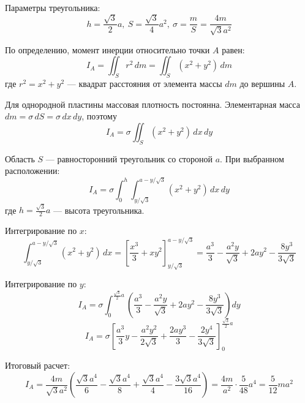 \begin{center}
\end{center}

Параметры треугольника:
\[ h = \frac{\sqrt{3}}{2}a,\ S = \frac{\sqrt{3}}{4}a^2,\ \sigma = \frac{m}{S} = \frac{4m}{\sqrt{3}a^2}\]

По определению, момент инерции относительно точки $A$ равен:
\[
I_A = \iint_S r^2 \, dm = \iint_S (x^2 + y^2) \, dm
\]
где $r^2 = x^2 + y^2$ --- квадрат расстояния от элемента массы $dm$ до вершины $A$.

Для однородной пластины массовая плотность постоянна. 
Элементарная масса $dm = \sigma \, dS = \sigma \, dx\,dy$, поэтому
\[
I_A = \sigma \iint_S (x^2 + y^2) \, dx\,dy
\]

Область $S$ --- равносторонний треугольник со стороной $a$. При выбранном расположении:
\[
I_A = \sigma \int_0^h \int_{y/\sqrt{3}}^{a - y/\sqrt{3}} (x^2 + y^2) \, dx \, dy
\]
где $h = \frac{\sqrt{3}}{2}a$ --- высота треугольника.

Интегрирование по $x$:
\[ \int_{y/\sqrt{3}}^{a - y/\sqrt{3}} (x^2 + y^2) \, dx = \left[ \frac{x^3}{3} + xy^2 \right]_{y/\sqrt{3}}^{a - y/\sqrt{3}} = \frac{a^3}{3} - \frac{a^2 y}{\sqrt{3}} + 2ay^2 - \frac{8y^3}{3\sqrt{3}}\]

Интегрирование по $y$:
\[ I_A = \sigma \int_0^{\frac{\sqrt{3}}{2}a} \left( \frac{a^3}{3} - \frac{a^2 y}{\sqrt{3}} + 2ay^2 - \frac{8y^3}{3\sqrt{3}} \right) dy \]
\[ I_A = \sigma \left[ \frac{a^3}{3}y - \frac{a^2 y^2}{2\sqrt{3}} + \frac{2ay^3}{3} - \frac{2y^4}{3\sqrt{3}} \right]_0^{\frac{\sqrt{3}}{2}a}\]

Итоговый расчет:
\[ I_A = \frac{4m}{\sqrt{3}a^2} \left( \frac{\sqrt{3}a^4}{6} - \frac{\sqrt{3}a^4}{8} + \frac{\sqrt{3}a^4}{4} - \frac{3\sqrt{3}a^4}{16} \right) = \frac{4m}{a^2} \cdot \frac{5}{48} a^4 = \frac{5}{12}ma^2 \]